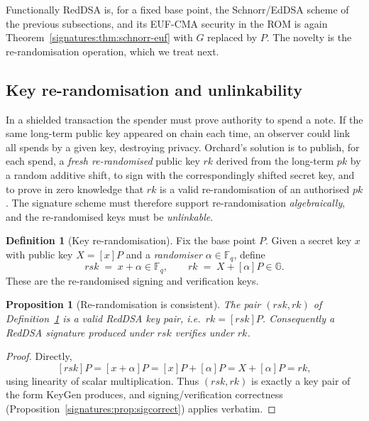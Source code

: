 \documentclass[11pt,a4paper]{article}
\newtheorem{proposition}[theorem]{Proposition}
\theoremstyle{definition}
\newtheorem{definition}[theorem]{Definition}
\theoremstyle{remark}
\newcommand{\G}{\ensuremath{\mathbb{G}}}
\newcommand{\Fq}{\ensuremath{\mathbb{F}_{q}}}
\begin{document}
Functionally RedDSA is, for a fixed base point, the Schnorr/EdDSA scheme of the previous subsections, and its EUF-CMA security in the ROM is again Theorem~\ref{signatures:thm:schnorr-euf} with \(G\) replaced by \(P\). The novelty is the re-randomisation operation, which we treat next.

\subsection{Key re-randomisation and unlinkability}\label{signatures:subsec:rerand}

In a shielded transaction the spender must prove authority to spend a note. If the same long-term public key appeared on chain each time, an observer could link all spends by a given key, destroying privacy. Orchard's solution is to publish, for each spend, a \emph{fresh re-randomised} public key \(\mathit{rk}\) derived from the long-term \(\mathit{pk}\) by a random additive shift, to sign with the correspondingly shifted secret key, and to prove in zero knowledge that \(\mathit{rk}\) is a valid re-randomisation of an authorised \(\mathit{pk}\). The signature scheme must therefore support re-randomisation \emph{algebraically}, and the re-randomised keys must be \emph{unlinkable}.

\begin{definition}[Key re-randomisation]\label{signatures:def:rerand}
Fix the base point \(P\). Given a secret key \(x\) with public key \(X = [x]P\) and a \emph{randomiser} \(\alpha \in \Fq\), define
\[
  \mathit{rsk} \;=\; x + \alpha \in \Fq, \qquad \mathit{rk} \;=\; X + [\alpha]P \in \G.
\]
These are the re-randomised signing and verification keys.
\end{definition}

\begin{proposition}[Re-randomisation is consistent]\label{signatures:prop:rerand-consistent}
The pair \((\mathit{rsk}, \mathit{rk})\) of Definition~\ref{signatures:def:rerand} is a valid RedDSA key pair, i.e.\ \(\mathit{rk} = [\mathit{rsk}]P\). Consequently a RedDSA signature produced under \(\mathit{rsk}\) verifies under \(\mathit{rk}\).
\end{proposition}

\begin{proof}
Directly,
\[
  [\mathit{rsk}]P = [x + \alpha]P = [x]P + [\alpha]P = X + [\alpha]P = \mathit{rk},
\]
using linearity of scalar multiplication. Thus \((\mathit{rsk}, \mathit{rk})\) is exactly a key pair of the form KeyGen produces, and signing/verification correctness (Proposition~\ref{signatures:prop:sigcorrect}) applies verbatim.
\end{proof}
\end{document}
